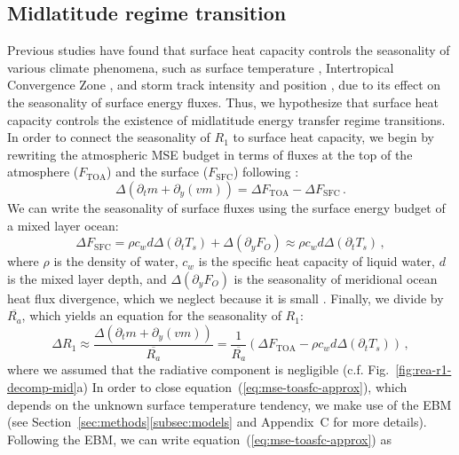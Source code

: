 \documentclass{ametsocV5}
\begin{document}
  \subsection{Midlatitude regime transition} \label{subsec:mld}
  Previous studies have found that surface heat capacity controls the seasonality of various climate phenomena, such as surface temperature \citep{donohoe2014}, Intertropical Convergence Zone \citep{bordoni2008}, and storm track intensity and position \citep{barpanda2020}, due to its effect on the seasonality of surface energy fluxes. Thus, we hypothesize that surface heat capacity controls the existence of midlatitude energy transfer regime transitions. In order to connect the seasonality of $R_1$ to surface heat capacity, we begin by rewriting the atmospheric MSE budget in terms of fluxes at the top of the atmosphere ($F_\mathrm{TOA}$) and the surface ($F_\mathrm{SFC}$) following \cite{barpanda2020}:
  \begin{equation}\label{eq:mse-toasfc}
    \Delta\left(\partial_t m + \partial_y (vm) \right) = \Delta F_{\mathrm{TOA}} - \Delta F_{\mathrm{SFC}} \, .
  \end{equation}
  We can write the seasonality of surface fluxes using the surface energy budget of a mixed layer ocean:
  \begin{equation}
    \Delta F_{\mathrm{SFC}} = \rho c_{w} d \Delta\left(\partial_t T_{s}\right) + \Delta ( \partial_y F_{O}) \approx \rho c_{w} d \Delta\left(\partial_t T_{s}\right) \, ,
  \end{equation}
  where $\rho$ is the density of water, $c_w$ is the specific heat capacity of liquid water, $d$ is the mixed layer depth, and $\Delta(\partial_y F_O)$ is the seasonality of meridional ocean heat flux divergence, which we neglect because it is small \citep{roberts2017}. Finally, we divide by $\overline{R_a}$, which yields an equation for the seasonality of $R_1$:
  \begin{equation}\label{eq:mse-toasfc-approx}
    \Delta R_1 \approx \frac{\Delta\left(\partial_t m + \partial_y (vm) \right)}{\overline{R_a}} = \frac{1}{\overline{R_a}} \left(\Delta F_{\mathrm{TOA}} - \rho c_{w} d \Delta\left(\partial_t T_{s}\right)\right) \, , 
  \end{equation}
  where we assumed that the radiative component is negligible (c.f. Fig.~\ref{fig:rea-r1-decomp-mid}a) In order to close equation~(\ref{eq:mse-toasfc-approx}), which depends on the unknown surface temperature tendency, we make use of the EBM (see Section~\ref{sec:methods}\ref{subsec:models} and Appendix~C for more details). Following the EBM, we can write equation~(\ref{eq:mse-toasfc-approx}) as
\end{document}
